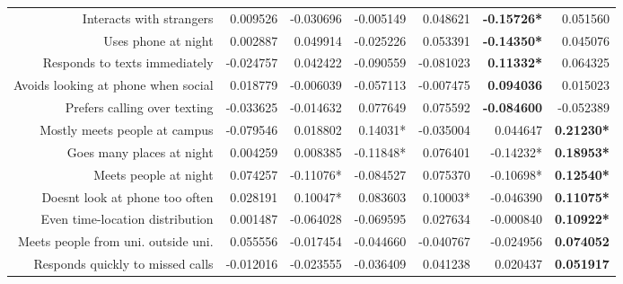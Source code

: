 {\begin{tabular}{rrrrrrr}
Interacts with strangers                &  0.009526				& -0.030696 			& -0.005149 			&  0.048621 			& \textbf{-0.15726*} 	&  0.051560 		\\
Uses phone at night                     &  0.002887				&  0.049914 			& -0.025226 			&  0.053391 			& \textbf{-0.14350*} 	&  0.045076 		\\
Responds to texts immediately           & -0.024757				&  0.042422 			& -0.090559 			& -0.081023 			& \textbf{ 0.11332*} 	&  0.064325 		\\
Avoids looking at phone when social     &  0.018779				& -0.006039 			& -0.057113 			& -0.007475 			& \textbf{ 0.094036} 	&  0.015023 		\\
Prefers calling over texting            & -0.033625				& -0.014632 			&  0.077649 			&  0.075592 			& \textbf{-0.084600} 	& -0.052389 		\\
Mostly meets people at campus           & -0.079546				&  0.018802 			&  0.14031* 			& -0.035004 			&  0.044647 			& \textbf{0.21230*} \\
Goes many places at night               &  0.004259				&  0.008385 			& -0.11848* 			&  0.076401 			& -0.14232* 			& \textbf{0.18953*} \\
Meets people at night                   &  0.074257				& -0.11076* 			& -0.084527 			&  0.075370 			& -0.10698* 			& \textbf{0.12540*} \\
Doesnt look at phone too often          &  0.028191				&  0.10047* 			&  0.083603 			&  0.10003* 			& -0.046390 			& \textbf{0.11075*} \\
Even time-location distribution      	&  0.001487				& -0.064028 			& -0.069595 			&  0.027634 			& -0.000840 			& \textbf{0.10922*} \\
Meets people from uni. outside uni.	    &  0.055556				& -0.017454 			& -0.044660 			& -0.040767 			& -0.024956 			& \textbf{0.074052} \\
Responds quickly to missed calls        & -0.012016				& -0.023555 			& -0.036409 			&  0.041238 			&  0.020437 			& \textbf{0.051917} \\
\bottomrule
\end{tabular}
}